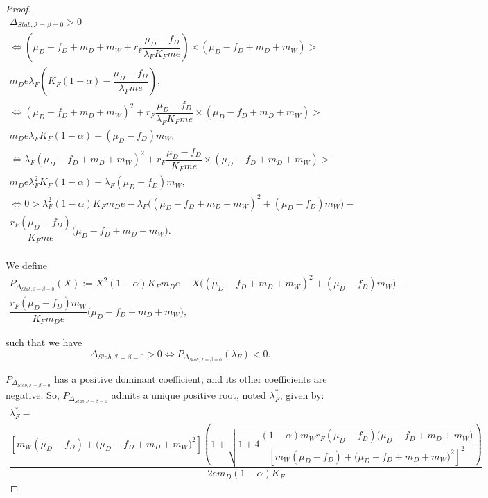 \documentclass{article}
\newcommand{\lfw}{\lambda_{F}}
\newcommand{\lfw}{\lambda_{F}}
\newcommand{\cI}{\mathcal{I}}
\theoremstyle{definition}
\theoremstyle{remark}
\begin{document}
\begin{appendix}
\begin{proof}
\begin{multline*}
\Delta_{Stab, \cI=\beta = 0} > 0 \\
\Leftrightarrow \left(\mu_D - f_D + m_D + m_W + r_F \dfrac{\mu_D - f_D}{\lfw K_F m e} \right) \times   \left( \mu_D -f_D + m_D + m_W \right) > \\ m_D e \lfw \left(K_F(1-\alpha) - \dfrac{\mu_D - f_D}{\lfw m e} \right), \\
\Leftrightarrow (\mu_D - f_D + m_D + m_W)^2 + r_F \dfrac{\mu_D - f_D}{\lfw K_F m e}  \times   \left( \mu_D -f_D + m_D + m_W \right) > \\ m_D e \lfw K_F(1-\alpha) - (\mu_D - f_D)m_W , \\
\Leftrightarrow \lfw (\mu_D - f_D + m_D + m_W)^2 + r_F \dfrac{\mu_D - f_D}{K_F m e}  \times   \left( \mu_D -f_D + m_D + m_W \right) > \\ m_D e \lfw^2 K_F(1-\alpha) - \lfw (\mu_D - f_D)m_W , \\
\Leftrightarrow 0 > \lfw^2 (1-\alpha) K_F  m_D e - \lfw \Big((\mu_D - f_D + m_D + m_W)^2 +(\mu_D - f_D)m_W \Big) - \\ \dfrac{r_F (\mu_D - f_D) }{K_F m e}  \big( \mu_D -f_D + m_D + m_W \big).\\
\end{multline*}

We define 
\begin{multline*}
P_{\Delta_{Stab, \cI= \beta = 0}}(X) := X^2 (1-\alpha) K_F  m_D e - X \Big((\mu_D - f_D + m_D + m_W)^2 +(\mu_D - f_D)m_W \Big) - \\ \dfrac{r_F (\mu_D - f_D) m_W}{K_F m_D e}  \big( \mu_D -f_D + m_D + m_W \big),
\end{multline*} 

such that we have 
\begin{equation}
\Delta_{Stab, \cI= \beta = 0} > 0 \Leftrightarrow P_{\Delta_{Stab, \cI= \beta = 0}}(\lfw) < 0.
\label{equation: equivalence DeltaStab}
\end{equation}

$P_{\Delta_{Stab, \cI = \beta = 0}}$ has a positive dominant coefficient, and its other coefficients are negative. So,  $P_{\Delta_{Stab, \cI= \beta = 0}}$ admits a unique positive root, noted $\lfw^*$, given by:
\begin{multline}
\lfw^* = \\
 \dfrac{\left[m_{W}(\mu_{D}-f_{D})+\big(\mu_{D}-f_{D}+m_{D}+m_{W})^{2}\right]\left(1+\sqrt{1+4\dfrac{(1-\alpha)m_{W}r_{F}\left(\mu_{D}-f_{D}\right)\big(\mu_{D}-f_{D}+m_{D}+m_{W})}{\left[m_{W}(\mu_{D}-f_{D})+\big(\mu_{D}-f_{D}+m_{D}+m_{W})^{2}\right]^{2}}}\right)}{2em_D (1-\alpha) K_F }
\end{multline}


\end{proof}
\end{appendix}
\end{document}
